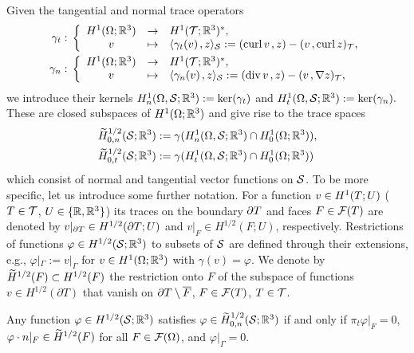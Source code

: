 \documentclass[11pt]{article}
\begin{document}
Given the tangential and normal trace operators
\begin{align*}
   \gamma_t:\;&\left\{\begin{array}{cll}
               H^1(\Omega;\mathbb{R}^3) &\rightarrow& H^1(\mathcal{T};\mathbb{R}^3)^*,\\
               v &\mapsto& \langle{}\gamma_t(v)\hspace*{.5mm},z\rangle_{\mathcal{S}}
               := (\operatorname{curl} v\hspace*{.5mm},z) - (v\hspace*{.5mm},\operatorname{curl} z)_{\mathcal{T}},
            \end{array}\right.\\
   \gamma_n:\;&\left\{\begin{array}{cll}
               H^1(\Omega;\mathbb{R}^3) &\rightarrow& H^1(\mathcal{T};\mathbb{R}^3)^*,\\
               v &\mapsto& \langle{}\gamma_n(v)\hspace*{.5mm},z\rangle_{\mathcal{S}}
               := (\operatorname{div} v\hspace*{.5mm},z) - (v\hspace*{.5mm},\nabla z)_{\mathcal{T}},
            \end{array}\right.
\end{align*}
we introduce their kernels
\(
   H^1_n(\Omega,\mathcal{S};\mathbb{R}^3):=\mathrm{ker}(\gamma_t)
\)
and
\(
   H^1_t(\Omega,\mathcal{S};\mathbb{R}^3):=\mathrm{ker}(\gamma_n).
\)
These are closed subspaces of $H^1(\Omega;\mathbb{R}^3)$ and give rise to the trace spaces
\begin{align}
   \widetilde H^{1/2}_{0,n}(\mathcal{S};\mathbb{R}^3) &:= \gamma(H^1_n(\Omega,\mathcal{S};\mathbb{R}^3)\cap H^1_0(\Omega;\mathbb{R}^3)),
   \label{H_trace_nor} \\ \nonumber
   \widetilde H^{1/2}_{0,t}(\mathcal{S};\mathbb{R}^3) &:= \gamma(H^1_t(\Omega,\mathcal{S};\mathbb{R}^3)\cap H^1_0(\Omega;\mathbb{R}^3))
\end{align}
%
which consist of normal and tangential vector functions on $\mathcal{S}$.
To be more specific, let us introduce some further notation.
For a function $v\in H^1(T;U)$ ($T\in\mathcal{T}$, $U\in\{\mathbb{R},\mathbb{R}^3\}$)
its traces on the boundary $\partial T$ and faces $F\in\mathcal{F}(T)$
are denoted by $v|_{\partial T}\in H^{1/2}(\partial T;U)$
and $v|_F\in H^{1/2}(F;U)$, respectively.
Restrictions of functions $\varphi\in H^{1/2}(\mathcal{S};\mathbb{R}^3)$ to subsets of $\mathcal{S}$
are defined through their extensions, e.g., $\varphi|_\Gamma:=v|_\Gamma$
for $v\in H^1(\Omega;\mathbb{R}^3)$ with $\gamma(v)=\varphi$.
We denote by $\widetilde H^{1/2}(F)\subset H^{1/2}(F)$ the restriction onto $F$
of the subspace of functions $v\in H^{1/2}(\partial T)$ that vanish on
$\partial T\setminus\overline{F}$, $F\in\mathcal{F}(T)$, $T\in\mathcal{T}$.

\begin{prop}[$\wtilde H^{1/2}_{0,n}(\cS;\Rt)$] \label{prop_trace_norm}
Any function $\varphi\in H^{1/2}(\mathcal{S};\mathbb{R}^3)$ satisfies
$\varphi\in \widetilde H^{1/2}_{0,n}(\mathcal{S};\mathbb{R}^3)$ if and only if
$\pi_t\varphi|_F=0$, $\varphi\cdot n|_F\in \widetilde H^{1/2}(F)$ for all $F\in\mathcal{F}(\Omega)$,
and $\varphi|_\Gamma=0$.
\end{prop}
\end{document}
